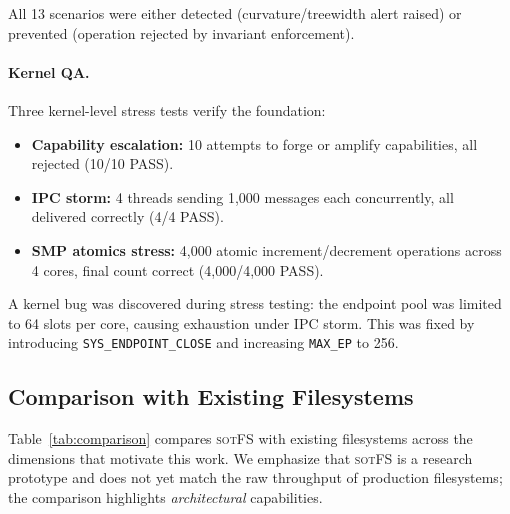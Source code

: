 \documentclass[11pt,a4paper]{article}
\theoremstyle{definition}
\theoremstyle{remark}
\newcommand{\sotfs}{\textsc{sotFS}}
\begin{document}
All 13 scenarios were either detected (curvature/treewidth alert
raised) or prevented (operation rejected by invariant enforcement).

\paragraph{Kernel QA.}
Three kernel-level stress tests verify the foundation:

\begin{itemize}[leftmargin=1.4em]
\item \textbf{Capability escalation:} 10 attempts to forge or
  amplify capabilities, all rejected (10/10 PASS).
\item \textbf{IPC storm:} 4 threads sending 1{,}000 messages each
  concurrently, all delivered correctly (4/4 PASS).
\item \textbf{SMP atomics stress:} 4{,}000 atomic
  increment/decrement operations across 4 cores, final count
  correct (4{,}000/4{,}000 PASS).
\end{itemize}

A kernel bug was discovered during stress testing: the endpoint pool
was limited to 64 slots per core, causing exhaustion under IPC storm.
This was fixed by introducing \texttt{SYS\_ENDPOINT\_CLOSE} and
increasing \texttt{MAX\_EP} to 256.

\subsection{Comparison with Existing Filesystems}
\label{sec:eval-comparison}

Table~\ref{tab:comparison} compares \sotfs{} with existing filesystems
across the dimensions that motivate this work. We emphasize that
\sotfs{} is a research prototype and does not yet match the raw
throughput of production filesystems; the comparison highlights
\emph{architectural} capabilities.
\end{document}
